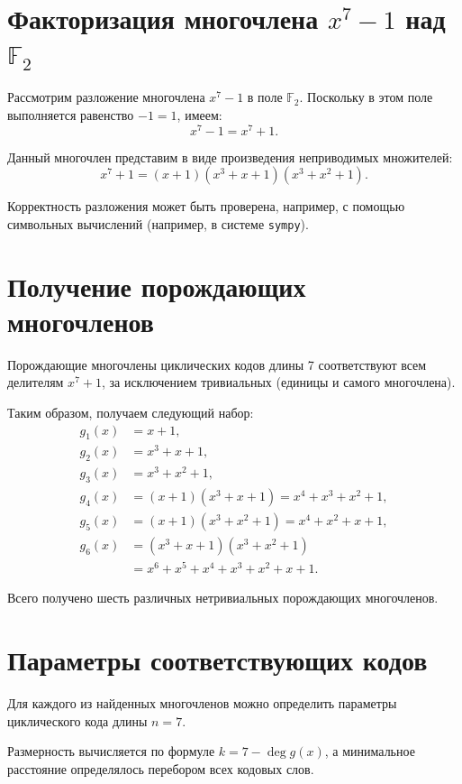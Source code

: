 \documentclass[a4paper,12pt]{article}
\begin{document}
\section{Факторизация многочлена $x^7 - 1$ над $\mathbb{F}_2$}

Рассмотрим разложение многочлена $x^7 - 1$ в поле $\mathbb{F}_2$. Поскольку в этом поле выполняется равенство $-1 = 1$, имеем:
\[
x^7 - 1 = x^7 + 1.
\]

Данный многочлен представим в виде произведения неприводимых множителей:
\[
x^7 + 1 = (x + 1)(x^3 + x + 1)(x^3 + x^2 + 1).
\]

Корректность разложения может быть проверена, например, с помощью символьных вычислений (например, в системе \texttt{sympy}).

\section{Получение порождающих многочленов}

Порождающие многочлены циклических кодов длины 7 соответствуют всем делителям $x^7 + 1$, за исключением тривиальных (единицы и самого многочлена).

Таким образом, получаем следующий набор:
\begin{align*}
g_1(x) &= x + 1, \\
g_2(x) &= x^3 + x + 1, \\
g_3(x) &= x^3 + x^2 + 1, \\
g_4(x) &= (x + 1)(x^3 + x + 1) = x^4 + x^3 + x^2 + 1, \\
g_5(x) &= (x + 1)(x^3 + x^2 + 1) = x^4 + x^2 + x + 1, \\
g_6(x) &= (x^3 + x + 1)(x^3 + x^2 + 1) \\
       &= x^6 + x^5 + x^4 + x^3 + x^2 + x + 1.
\end{align*}

Всего получено шесть различных нетривиальных порождающих многочленов.

\section{Параметры соответствующих кодов}

Для каждого из найденных многочленов можно определить параметры циклического кода длины $n = 7$.

Размерность вычисляется по формуле $k = 7 - \deg g(x)$, а минимальное расстояние определялось перебором всех кодовых слов.
\end{document}
